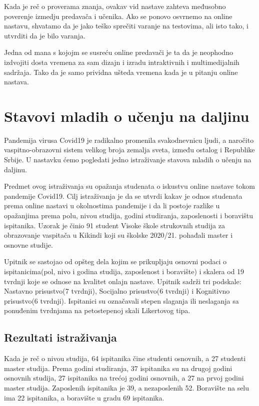 \documentclass{article}
\begin{document}
Kada je reč o proverama znanja, ovakav vid nastave zahteva međusobno poverenje izmedju predavača i učenika. Ako se ponovo osvrnemo na online nastavu, shvatamo da je jako teško sprečiti varanje na testovima, ali isto tako, i utvrditi da je bilo varanja. 

Jedna od mana s kojojm se susreću online predavači je ta da je neophodno izdvojiti dosta vremena za sam dizajn i izradu intraktivnih i multimedijalnih sadržaja. Tako da je samo prividna ušteda vremena kada je u pitanju online nastava.\cite{3}

\section{Stavovi mladih o učenju na daljinu}

Pandemija virusa Covid19 je radikalno promenila svakodnevnicu ljudi, a naročito vaspitno-obrazovni sistem velikog broja zemalja sveta, između ostalog i Republike Srbije. U nastavku ćemo pogledati jedno istraživanje stavova mladih o učenju na daljinu.\cite{4}

Predmet ovog istraživanja su opažanja studenata o iskustvu online nastave tokom pandemije Covid19. Cilj istraživanja je da se utvrdi kakav je odnos studenata prema online nastavi u okolnostima pandemije i da li postoje razlike u opažanjima prema polu, nivou studija, godini studiranja, zaposlenosti i boravištu ispitanika. Uzorak je činio 91 student Visoke škole strukovnih studija za obrazovanje vaspitača u Kikindi koji su školske 2020/21. pohađali master i osnovne studije.

Upitnik se sastojao od opšteg dela kojim se prikupljaju osnovni podaci o ispitanicima(pol, nivo i godina studija, zaposlenost i boravište) i skalera od 19 tvrdnji koje se odnose na kvalitet onlajn nastave. Upitnik sadrži tri podskale: Nastavno prisustvo(7 tvrdnji), Socijalno prisustvo(6 tvrdnji) i Kognitivno prisustvo(6 tvrdnji). Ispitanici su označavali stepen slaganja ili neslaganja sa ponuđenim tvrdnjama na petostepenoj skali Likertovog tipa.\cite{6}

\subsection{Rezultati istraživanja}

 Kada je reč o nivou studija, 64 ispitanika čine studenti osnovnih, a 27 studenti master studija. Prema godini studiranja, 37 ispitanika su na drugoj godini osnovnih studija, 27 ispitanika na trećoj godini osnovnih, a 27 na prvoj godini master studija. Zaposlenih ispitanika je 39, a nezaposlenih 52. Boravište na selu ima 22 ispitanika, a boravište u gradu 69 ispitanika.
\end{document}
